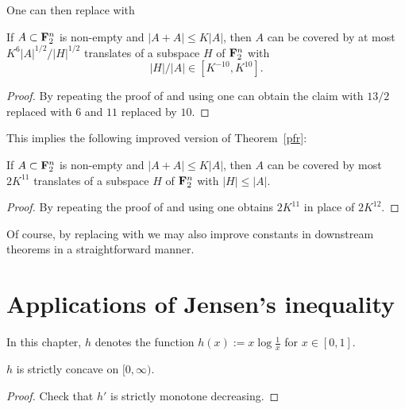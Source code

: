 One can then replace  with

\begin{lemma}\label{pfr_aux-improv}\leanok
If $A \subset {\bf F}_2^n$ is non-empty and
$|A+A| \leq K|A|$, then $A$ can be covered by at most $K^6 |A|^{1/2}/|H|^{1/2}$ translates of a subspace $H$ of ${\bf F}_2^n$ with
$$
  |H|/|A| \in [K^{-10}, K^{10}].
$$
\end{lemma}

\begin{proof}\leanok
By repeating the proof of  and using  one can obtain the claim with $13/2$
replaced with $6$ and $11$ replaced by $10$.
\end{proof}

This implies the following improved version of Theorem~\ref{pfr}:

\begin{theorem}\label{pfr-improv}\leanok
  If $A \subset {\bf F}_2^n$ is non-empty and $|A+A| \leq K|A|$, then $A$ can be covered by most $2K^{11}$ translates of a subspace $H$ of ${\bf F}_2^n$ with $|H| \leq |A|$.
\end{theorem}

\begin{proof}\leanok
By repeating the proof of  and using  one obtains $2K^{11}$ in place of $2K^{12}$.
\end{proof}

Of course, by replacing  with  we may also improve constants in downstream theorems in a straightforward manner.


\chapter{Applications of Jensen's inequality}

In this chapter, $h$ denotes the function $h(x) := x \log \frac{1}{x}$ for $x \in [0,1]$.

\begin{lemma}[Concavity]\label{concave}
  \leanok
  $h$ is strictly concave on $[0,\infty)$.
\end{lemma}

\begin{proof} \leanok Check that $h'$ is strictly monotone decreasing.
\end{proof}


